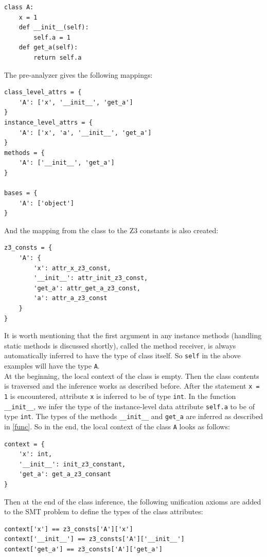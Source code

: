 \begin{lstlisting}
class A:
	x = 1
	def __init__(self):
		self.a = 1
	def get_a(self):
		return self.a
\end{lstlisting}

The pre-analyzer gives the following mappings:
\begin{lstlisting}
class_level_attrs = {
	'A': ['x', '__init__', 'get_a']
}
instance_level_attrs = {
	'A': ['x', 'a', '__init__', 'get_a']
}
methods = {
	'A': ['__init__', 'get_a']
}

bases = {
	'A': ['object']
}
\end{lstlisting}

And the mapping from the class to the Z3 constants is also created:
\begin{lstlisting}
z3_consts = {
	'A': {
		'x': attr_x_z3_const,
		'__init__': attr_init_z3_const,
		'get_a': attr_get_a_z3_const,
		'a': attr_a_z3_const
	}
}
\end{lstlisting}

It is worth mentioning that the first argument in any instance methods (handling static methods is discussed shortly), called the method receiver, is always automatically inferred to have the type of class itself. So \lstinline|self| in the above examples will have the type \lstinline|A|. \\

At the beginning, the local context of the class is empty. Then the class contents is traversed and the inference works as described before. After the statement \lstinline|x = 1| is encountered, attribute \lstinline|x| is inferred to be of type \lstinline|int|. In the function \lstinline|__init__|, we infer the type of the instance-level data attribute \lstinline|self.a| to be of type \lstinline|int|. The types of the methods \lstinline|__init__| and \lstinline|get_a| are inferred as described in \ref{func}. So in the end, the local context of the class \lstinline|A| looks as follows:
\begin{lstlisting}
context = {
	'x': int,
	'__init__': init_z3_constant,
	'get_a': get_a_z3_consant
}
\end{lstlisting}

Then at the end of the class inference, the following unification axioms are added to the SMT problem to define the types of the class attributes:

\begin{lstlisting}
context['x'] == z3_consts['A']['x']
context['__init__'] == z3_consts['A']['__init__']
context['get_a'] == z3_consts['A']['get_a']
\end{lstlisting}

